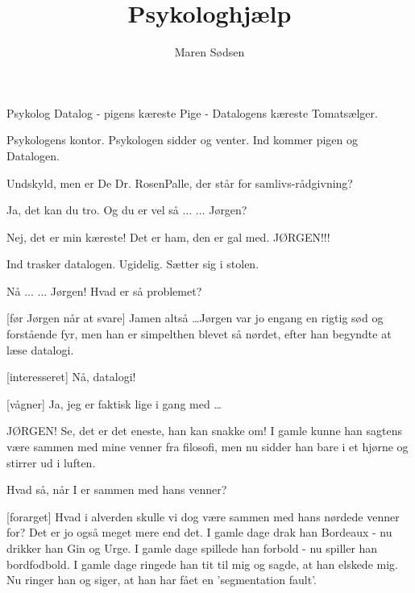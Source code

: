 \documentclass[danish]{article}
\title{Psykologhjælp}
\author{Maren Sødsen}
\begin{document}
\maketitle

\begin{roles}
   Psykolog
   Datalog - pigens kæreste
   Pige - Datalogens kæreste
   Tomatsælger.
\end{roles}

\begin{props}
\end{props}

\begin{sketch}

\scene Psykologens kontor. Psykologen sidder og venter. Ind kommer pigen og
Datalogen.

 Undskyld, men er De Dr. RosenPalle, der står for
samlivs-rådgivning?

 Ja, det kan du tro. Og du er vel så ... ... Jørgen?

 Nej, det er min kæreste! Det er ham, den er gal
med.  JØRGEN!!!

\scene Ind trasker datalogen. Ugidelig. Sætter sig i stolen.

Nå ...  ... Jørgen! Hvad er så problemet?

[før Jørgen når at svare] Jamen altså \ldots Jørgen var jo
engang en rigtig sød og forstående fyr, men han er simpelthen blevet så
nørdet, efter han begyndte at læse datalogi.

 [interesseret] Nå, datalogi! 

 [vågner] Ja, jeg er faktisk lige i gang med \ldots {}

 JØRGEN! Se, det er det eneste, han kan snakke om! I gamle kunne
han sagtens være sammen med mine venner fra filosofi, men nu sidder han
bare i et hjørne og stirrer ud i luften.

 Hvad så, når I er sammen med hans venner?

 [forarget] Hvad i alverden skulle vi dog være sammen med hans
nørdede venner for? Det er jo også meget mere end det. I gamle dage drak
han Bordeaux - nu drikker han Gin og Urge. I gamle dage spillede han
forbold - nu spiller han bordfodbold. I gamle dage ringede han tit til mig og sagde, at han elskede mig. Nu ringer han og
siger, at han har fået en 'segmentation fault'.


\end{sketch}
\end{document}
